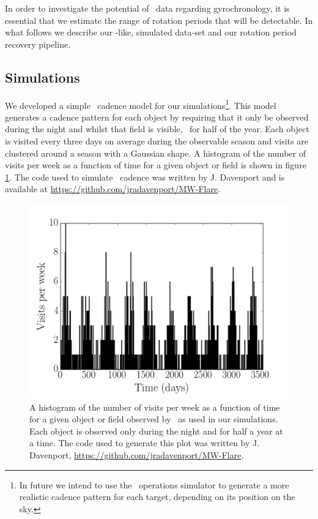 In order to investigate the potential of \LSST\ data regarding gyrochronology,
it is essential that we estimate the range of rotation periods that will be
detectable.
In what follows we describe our \LSST-like, simulated data-set and our
rotation period recovery pipeline.

\subsection{Simulations}
We developed a simple \LSST\ cadence model for our simulations\footnote{In
future we intend to use the \LSST\ operations simulator
\citep[OpSim][]{Ridgway2012} to generate a more realistic cadence pattern for
each target, depending on its position on the sky.}.
This model generates a cadence pattern for each object by requiring that it
only be observed during the night and whilst that field is visible, \ie\ for
half of the year.
Each object is visited every three days on average during the observable
season and visits are clustered around a season with a Gaussian shape.
A histogram of the number of visits per week as a function of time for a given
object or field is shown in figure \ref{fig:cadence_hist}.
The code used to simulate \LSST\ cadence was written by J. Davenport and is
available at \url{https://github.com/jradavenport/MW-Flare}.

\begin{figure}
\begin{center}
\includegraphics[width=6in, clip=true]{figures/cadence_hist}
\caption[An \LSST\ cadence histogram.]
{A histogram of the number of visits per week as a function of time
for a given object or field observed by \LSST\, as used in our simulations.
Each object is observed only during the night and for half a year at a time.
The code used to generate this plot was written by J. Davenport,
\url{https://github.com/jradavenport/MW-Flare}.}
\label{fig:cadence_hist}
\end{center}
\end{figure}

